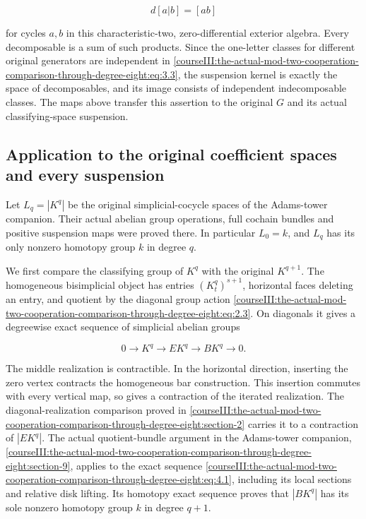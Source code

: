 \begin{equation}
d[a|b]=[ab]
\label{courseIII:the-actual-mod-two-cooperation-comparison-through-degree-eight:eq:3.4}
\end{equation}

for cycles \(a,b\) in this characteristic-two, zero-differential exterior algebra. Every decomposable is a sum of such products. Since the one-letter classes for different original generators are independent in \eqref{courseIII:the-actual-mod-two-cooperation-comparison-through-degree-eight:eq:3.3}, the suspension kernel is exactly the space of decomposables, and its image consists of independent indecomposable classes. The maps above transfer this assertion to the original \(G\) and its actual classifying-space suspension.

\subsection{Application to the original coefficient spaces and every suspension}
\label{courseIII:the-actual-mod-two-cooperation-comparison-through-degree-eight:actual-eight-original-suspension}

\label{courseIII:the-actual-mod-two-cooperation-comparison-through-degree-eight:section-4}\label{courseIII:actual-degree8:4}

Let \(L_q=|K^q|\) be the original simplicial-cocycle spaces of the Adams-tower companion. Their actual abelian group operations, full cochain bundles and positive suspension maps were proved there. In particular \(L_0=k\), and \(L_q\) has its only nonzero homotopy group \(k\) in degree \(q\).

We first compare the classifying group of \(K^q\) with the original \(K^{q+1}\). The homogeneous bisimplicial object has entries \((K^q_t)^{s+1}\), horizontal faces deleting an entry, and quotient by the diagonal group action \eqref{courseIII:the-actual-mod-two-cooperation-comparison-through-degree-eight:eq:2.3}. On diagonals it gives a degreewise exact sequence of simplicial abelian groups

\begin{equation}
0\longrightarrow K^q\longrightarrow E K^q\longrightarrow B K^q\longrightarrow0.
\label{courseIII:the-actual-mod-two-cooperation-comparison-through-degree-eight:eq:4.1}
\end{equation}

The middle realization is contractible. In the horizontal direction, inserting the zero vertex contracts the homogeneous bar construction. This insertion commutes with every vertical map, so gives a contraction of the iterated realization. The diagonal-realization comparison proved in \cref{courseIII:the-actual-mod-two-cooperation-comparison-through-degree-eight:section-2} carries it to a contraction of \(|EK^q|\). The actual quotient-bundle argument in the Adams-tower companion, \cref{courseIII:the-actual-mod-two-cooperation-comparison-through-degree-eight:section-9}, applies to the exact sequence \eqref{courseIII:the-actual-mod-two-cooperation-comparison-through-degree-eight:eq:4.1}, including its local sections and relative disk lifting. Its homotopy exact sequence proves that \(|BK^q|\) has its sole nonzero homotopy group \(k\) in degree \(q+1\).

